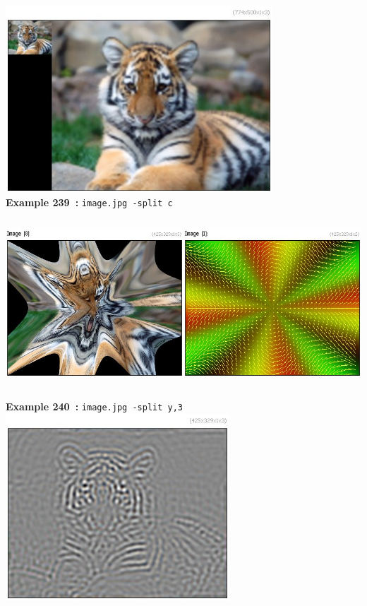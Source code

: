 \documentclass[a4paper,11pt,twoside]{book}
\begin{document}
\begin{center}\includegraphics[keepaspectratio=true,height=7cm,width=\textwidth]{img/gmic_def239.jpg}\\
{\footnotesize \textbf{Example 239~:} \texttt{image.jpg -split c}}
\\\includegraphics[keepaspectratio=true,height=7cm,width=\textwidth]{img/gmic_def240.jpg}\\
{\footnotesize \textbf{Example 240~:} \texttt{image.jpg -split y,3}}
\\\includegraphics[keepaspectratio=true,height=7cm,width=\textwidth]{img/gmic_def241.jpg}\\

\end{center}
\end{document}
